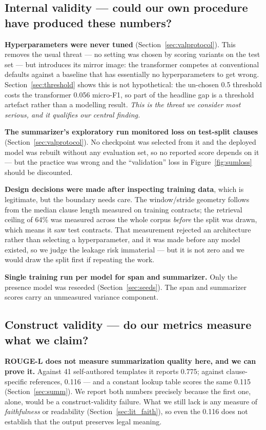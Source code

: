 \subsection{Internal validity --- could our own procedure have produced these numbers?}
\textbf{Hyperparameters were never tuned} (Section~\ref{sec:valprotocol}). This removes the usual threat --- no setting was chosen by scoring variants on the test set --- but introduces its mirror image: the transformer competes at conventional defaults against a baseline that has essentially no hyperparameters to get wrong. Section~\ref{sec:threshold} shows this is not hypothetical: the un-chosen 0.5 threshold costs the transformer 0.056 micro-F1, so part of the headline gap is a threshold artefact rather than a modelling result. \emph{This is the threat we consider most serious, and it qualifies our central finding.}

\textbf{The summarizer's exploratory run monitored loss on test-split clauses} (Section~\ref{sec:valprotocol}). No checkpoint was selected from it and the deployed model was rebuilt without any evaluation set, so no reported score depends on it --- but the practice was wrong and the ``validation'' loss in Figure~\ref{fig:sumloss} should be discounted.

\textbf{Design decisions were made after inspecting training data}, which is legitimate, but the boundary needs care. The window/stride geometry follows from the median clause length measured on training contracts; the retrieval ceiling of 64\% was measured across the whole corpus \emph{before} the split was drawn, which means it saw test contracts. That measurement rejected an architecture rather than selecting a hyperparameter, and it was made before any model existed, so we judge the leakage risk immaterial --- but it is not zero and we would draw the split first if repeating the work.

\textbf{Single training run per model for span and summarizer.} Only the presence model was reseeded (Section~\ref{sec:seeds}). The span and summarizer scores carry an unmeasured variance component.

\subsection{Construct validity --- do our metrics measure what we claim?}
\textbf{ROUGE-L does not measure summarization quality here, and we can prove it.} Against 41 self-authored templates it reports 0.775; against clause-specific references, 0.116 --- and a constant lookup table scores the same 0.115 (Section~\ref{sec:summ}). We report both numbers precisely because the first one, alone, would be a construct-validity failure. What we still lack is any measure of \emph{faithfulness} or readability (Section~\ref{sec:lit_faith}), so even the 0.116 does not establish that the output preserves legal meaning.

